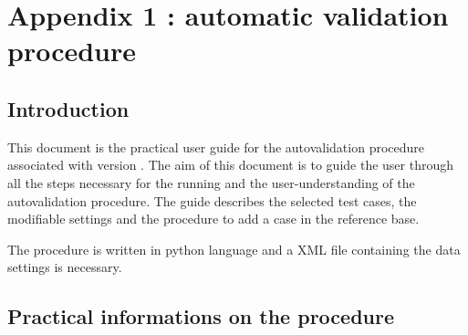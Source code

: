 %
%
%
%
%
%
%
%
\section{Appendix 1 : automatic validation procedure}
\label{prg_autovalid}
\subsection{Introduction}

This document is the practical user guide for the autovalidation
procedure associated with \CS version \verscs.
The aim of this document is to guide the user through all the steps
necessary for the running and the user-understanding of the autovalidation
procedure.
The guide describes the selected test cases, the modifiable settings
and the procedure to add a case in the reference base.

The procedure is written in python language and a XML file containing the
data settings is necessary.

\subsection{Practical informations on the procedure}

